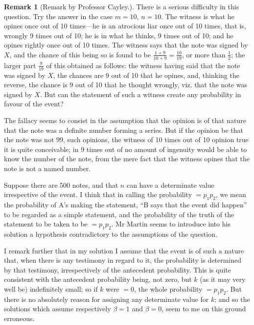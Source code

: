 \documentclass[11pt,a4paper]{article}
\theoremstyle{definition}
\newtheorem*{remark}{Remark}
\begin{document}
\begin{remark}[Remark by Professor Cayley.]
There is a serious difficulty in this question. Try the answer in the case $m=10$, $n=10$. The witness is what he opines once out of 10 times---he is an atrocious liar once out of 10 times, that is, wrongly 9 times out of 10; he is in what he thinks, 9 times out of 10; and he opines rightly once out of 10 times. The witness says that the note was signed by $X$, and the chance of this being so is found to be $\frac{1+9}{10+9} = \frac{10}{19}$, or more than $\frac{1}{2}$; the larger part $\frac{9}{19}$ of this obtained as follows: the witness having said that the note was signed by $X$, the chances are 9 out of 10 that he opines, and, thinking the reverse, the chance is 9 out of 10 that he thought wrongly, viz. that the note was signed by $X$. But can the statement of such a witness create any probability in favour of the event?

The fallacy seems to consist in the assumption that the opinion is of that nature that the note was a definite number forming a series. But if the opinion be that the note was not 99, such opinions, the witness of 10 times out of 10 opinion true it is quite conceivable; in 9 times out of no amount of ingenuity would be able to know the number of the note, from the mere fact that the witness opines that the note is not a named number.

Suppose there are 500 notes, and that $n$ can have a determinate value irrespective of the event. I think that in calling the probability $= p_1p_2$, we mean the probability of A's making the statement, ``B says that the event did happen'' to be regarded as a simple statement, and the probability of the truth of the statement to be taken to be $= p_1p_2$. Mr Martin seems to introduce into his solution a hypothesis contradictory to the assumptions of the question.

I remark further that in my solution I assume that the event is of such a nature that, when there is any testimony in regard to it, the probability is determined by that testimony, irrespectively of the antecedent probability. This is quite consistent with the antecedent probability being, not zero, but $k$ (as it may very well be) indefinitely small; so if $k$ were $=0$, the whole probability $= p_1p_2$. But there is no absolutely reason for assigning any determinate value for $k$; and so the solutions which assume respectively $\beta=1$ and $\beta=0$, seem to me on this ground erroneous.
\end{remark}
\end{document}
